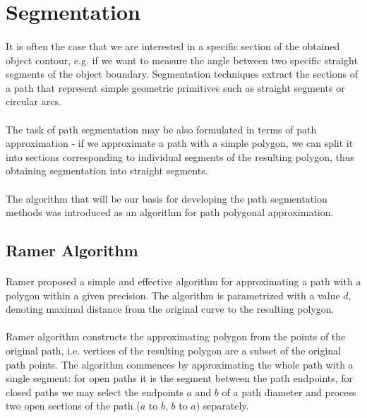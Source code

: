 \section{Segmentation}

\paragraph*{}
It is often the case that we are interested in a specific section of the obtained object contour, e.g. if we want to measure the angle between two specific straight segments of the object boundary. Segmentation techniques extract the sections of a path that represent simple geometric primitives such as straight segments or circular arcs.

\paragraph*{}
The task of path segmentation may be also formulated in terms of path approximation - if we approximate a path with a simple polygon, we can split it into sections corresponding to individual segments of the resulting polygon, thus obtaining segmentation into straight segments.

\paragraph*{}
The algorithm that will be our basis for developing the path segmentation methods was introduced as an algorithm for path polygonal approximation.

\subsection{Ramer Algorithm}

\paragraph*{}
Ramer proposed\cite{Ramer72} a simple and effective algorithm for approximating a path with a polygon within a given precision. The algorithm is parametrized with a value $d$, denoting maximal distance from the original curve to the resulting polygon.

\paragraph*{}
Ramer algorithm constructs the approximating polygon from the points of the original path, i.e. vertices of the resulting polygon are a subset of the original path points. The algorithm commences by approximating the whole path with a single segment: for open paths it is the segment between the path endpoints, for closed paths we may select the endpoints $a$ and $b$ of a path diameter and process two open sections of the path ($a$ to $b$, $b$ to $a$) separately.

